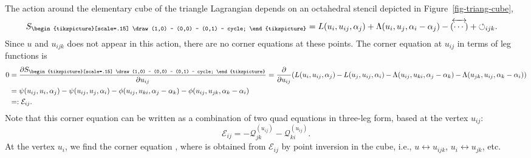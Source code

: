 \documentclass[10pt,a4paper]{amsart}
\newcommand{\inversion}[1]{\!\overleftrightarrow{\,#1\,}\!}
\newcommand{\reverse}{{\,\overleftrightarrow{\!(\cdots)\!}\,}}
\newcommand{\triang}{{\begin{tikzpicture}[scale=.15]
			\draw (1,0) -- (0,0) -- (0,1) -- cycle;
\end{tikzpicture}}}
\newcommand{\cyclic}{{\circlearrowleft}_{ijk}}
\newcommand{\pdv}[2]{\frac{\partial {#1}}{\partial {#2}}}
\numberwithin{equation}{section}
\begin{document}
The action around the elementary cube of the triangle Lagrangian depends on an octahedral stencil depicted in Figure~\ref{fig-triang-cube},
\begin{align}\label{Striangle}
 S_\triang &= L(u_i,u_{ij},\alpha_j) + \Lambda(u_i,u_j,\alpha_i-\alpha_j) - \reverse + \cyclic .
\end{align}
Since $u$ and $u_{ijk}$ does not appear in this action, there are no corner equations at these points.
The corner equation at $u_{ij}$ in terms of leg functions is
\begin{align}
	0 &= \pdv{S_\triang}{u_{ij}}
 = \pdv{}{u_{ij}} ( L(u_i,u_{ij},\alpha_j)\hspace{-0.5pt} -\hspace{-0.5pt} L(u_j,u_{ij},\alpha_i)\hspace{-0.5pt} - \hspace{-0.5pt} \Lambda(u_{ij},u_{ki}, \alpha_j-\alpha_k) \hspace{-0.5pt}-\hspace{-0.5pt} \Lambda(u_{jk},u_{ij}, \alpha_k-\alpha_i)) \notag \\
 &= \psi(u_{ij},u_i,\alpha_j) - \psi(u_{ij},u_j,\alpha_i) - \phi(u_{ij},u_{ki}, \alpha_j-\alpha_k) - \phi(u_{ij},u_{jk}, \alpha_k-\alpha_i) \notag \\
 & =: \mathcal{E}_{ij} .\label{triangle-corners}
\end{align}
Note that this corner equation can be written as a combination of two quad equations in three-leg form, based at the vertex $u_{ij}$:
\begin{equation}\label{fourlegE-QQ}
 \mathcal{E}_{ij} = -\mathcal Q^{(u_{ij})}_{jk} - \mathcal Q^{(u_{ij})}_{ki} .
\end{equation}
At the vertex $u_i$, we find the corner equation \smash{$\inversion{\mathcal{E}}_{ij} = 0$}, where \smash{$\inversion{\mathcal{E}}_{ij} := -\mathcal{Q}^{(u_k)}_{jk} - \mathcal{Q}^{(u_k)}_{ki}$} is obtained from $\mathcal{E}_{ij}$ by point inversion in the cube, i.e., $u \leftrightarrow u_{ijk}$, $u_i \leftrightarrow u_{jk}$, etc.
\end{document}
